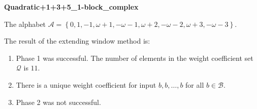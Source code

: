 \begin{exmp}
\textbf{ Quadratic+1+3+5\_1-block\_complex }

\label{ex:Quadratic+1+3+51-blockcomplex}

The alphabet $\mathcal{A} =\left\{0, 1, -1, \omega + 1, -\omega - 1, \omega + 2, -\omega - 2, \omega + 3, -\omega - 3\right\}$.

The result of the extending window method is:
\begin{enumerate}
    \item Phase 1 was successful.
The number of elements in the weight coefficient set $\mathcal{Q}$ is $11$.

    \item There is a unique weight coefficient for input $b,b,\dots,b$ for all $b\in\mathcal{B}$.

    \item Phase 2 was not successful.

\end{enumerate}
\end{exmp}
